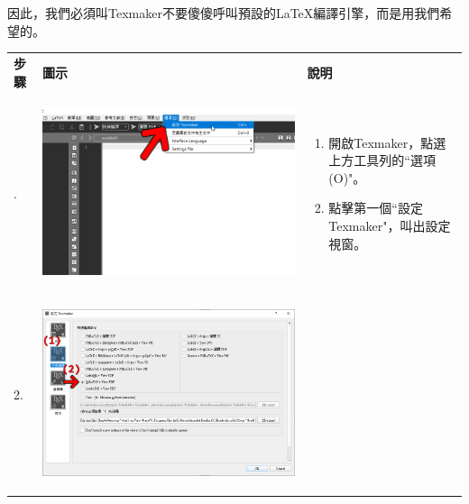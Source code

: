\documentclass{../indiv}
\begin{document}
	因此，我們必須叫Texmaker不要傻傻呼叫預設的\LaTeX 編譯引擎，而是用我們希望的。
	\begin{table}[H]
		\centering
		\OSfamily
		\setlength{\tabcolsep}{10pt}
		\begin{tabular}{Z}
			\Thline
			 \textrm{\textbf{\large 步驟}} & \textbf{\large 圖示} & \textbf{\large 說明}\\. &
			\begin{tabmp}[0]
				\centering
				\includegraphics[width=\linewidth]{configure-texmaker-1.png}
			\end{tabmp} &
			\begin{tabmp}
				\begin{enumerate}[label=\texttt{(\arabic*)}, nosep, left=0pt, labelsep=0.5ex]
					\item 開啟Texmaker，點選上方工具列的``選項(O)"。
					\item 點擊第一個``設定Texmaker"，叫出設定視窗。
				\end{enumerate}
			\end{tabmp}\\
			2. &
			\begin{tabmp}[-0.2]
				\centering
				\includegraphics[width=\linewidth]{configure-texmaker-2.png}

\end{tabmp}
\end{tabular}
\end{table}
\end{document}

